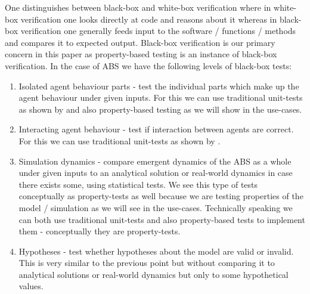 One distinguishes between black-box and white-box verification where in white-box verification one looks directly at code and reasons about it whereas in black-box verification one generally feeds input to the software / functions / methods and compares it to expected output. Black-box verification is our primary concern in this paper as property-based testing is an instance of black-box verification. In the case of ABS we have the following levels of black-box tests:
\begin{enumerate}
	\item Isolated agent behaviour parts - test the individual parts which make up the agent behaviour under given inputs. For this we can use traditional unit-tests as shown by \cite{collier_test-driven_2013} and also property-based testing as we will show in the use-cases.
	\item Interacting agent behaviour - test if interaction between agents are correct. For this we can use traditional unit-tests as shown by \cite{collier_test-driven_2013}.
	\item Simulation dynamics - compare emergent dynamics of the ABS as a whole under given inputs to an analytical solution or real-world dynamics in case there exists some, using statistical tests. We see this type of tests conceptually as property-tests as well because we are testing properties of the model / simulation as we will see in the use-cases. Technically speaking we can both use traditional unit-tests and also property-based tests to implement them - conceptually they are property-tests.
	\item Hypotheses - test whether hypotheses about the model are valid or invalid. This is very similar to the previous point but without comparing it to analytical solutions or real-world dynamics but only to some hypothetical values.
\end{enumerate}